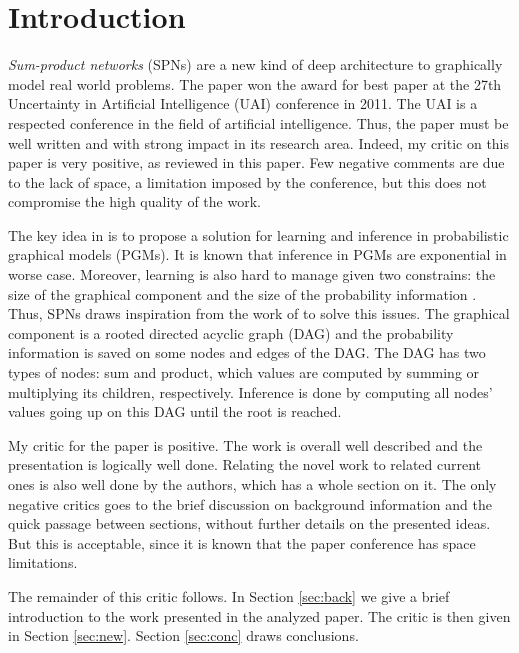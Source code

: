 \section{Introduction}
\label{sec:intro}

\emph{Sum-product networks} (SPNs) \citep{Poon2011} are a new kind of deep architecture to graphically model real world problems.
The paper \citep{Poon2011} won the award for best paper at the 27th Uncertainty in Artificial Intelligence (UAI) conference in 2011.
The UAI is a respected conference in the field of artificial intelligence.
Thus, the paper must be well written and with strong impact in its research area.
Indeed, my critic on this paper is very positive, as reviewed in this paper.
Few negative comments are due to the lack of space, a limitation imposed by the conference, but this does not compromise the high quality of the work.

The key idea in \citep{Poon2011} is to propose a solution for learning and inference in probabilistic graphical models (PGMs).
It is known \citep{koll09} that inference in PGMs are exponential in worse case.
Moreover, learning is also hard to manage given two constrains: the size of the graphical component and the size of the probability information \citep{Zhao2015}.
Thus, SPNs draws inspiration from the work of \cite{Darwiche2009} to solve this issues.
The graphical component is a rooted directed acyclic graph (DAG) and the probability information is saved on some nodes and edges of the DAG.
The DAG has two types of nodes: sum and product, which values are computed by summing or multiplying its children, respectively.
Inference is done by computing all nodes' values going up on this DAG until the root is reached.

My critic for the paper is positive.
The work is overall well described and the presentation is logically well done.
Relating the novel work to related current ones is also well done by the authors, which has a whole section on it.
The only negative critics goes to the brief discussion on background information and the quick passage between sections, without further details on the presented ideas.
But this is acceptable, since it is known that the paper conference has space limitations.

The remainder of this critic follows.
In Section \ref{sec:back} we give a brief introduction to the work presented in the analyzed paper.
The critic is then given in Section \ref{sec:new}.
Section \ref{sec:conc} draws conclusions.